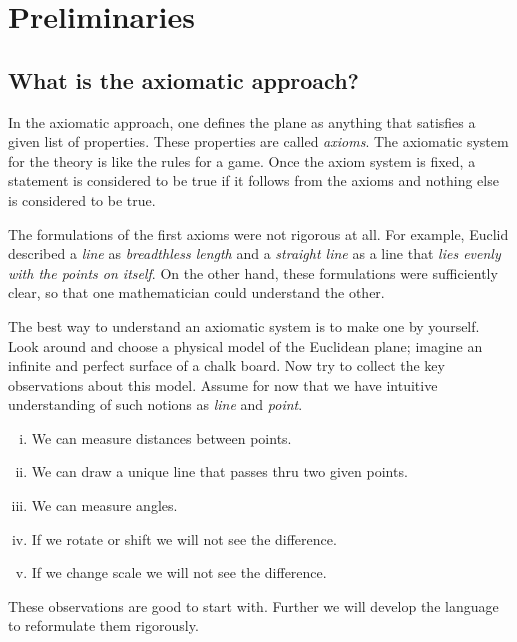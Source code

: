 \chapter{Preliminaries}\label{chap:metr}

\section*{What is the axiomatic approach?}

In the axiomatic approach, one defines the plane as anything that satisfies a given list of properties.
These properties are called {}\emph{axioms}.
The axiomatic system for the theory 
is like the rules for a game.
Once the axiom system is fixed, a statement is considered to be true if it follows from the axioms and nothing else is considered to be true.

The formulations of the first axioms were not rigorous at all.
For example, Euclid described a {}\emph{line} as {}\emph{breadthless length}
and a {}\emph{straight line} as a line that {}\emph{lies evenly with the points on itself}.
On the other hand,
these formulations were sufficiently clear, 
so that one mathematician could understand the other.

The best way to understand an axiomatic system
is to make one by yourself.
Look around and choose a physical model 
of the Euclidean plane;
imagine an infinite and perfect surface of a chalk board. 
Now try to collect the key observations
about this model.
Assume for now that we have intuitive understanding of such notions as {}\emph{line} and {}\emph{point}.
\begin{enumerate}[(i)]
 \item\label{preaxiomI} We can measure distances between points.
 \item\label{preaxiomII} We can draw a unique line 
 that passes thru two given points.
 \item\label{preaxiomIII} We can measure angles.
 \item\label{preaxiomIV} If we rotate or shift we will not see the difference.
 \item\label{preaxiomV} If we change scale we will not see the difference.
\end{enumerate}
These observations are good to start with.
Further we will develop the language
to reformulate them rigorously.

